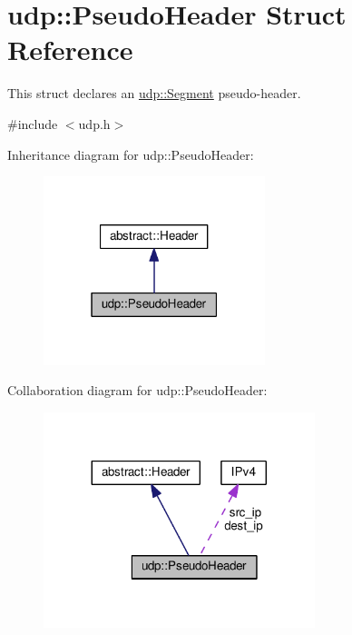 \hypertarget{structudp_1_1PseudoHeader}{}\section{udp\+:\+:Pseudo\+Header Struct Reference}
\label{structudp_1_1PseudoHeader}


This struct declares an \hyperlink{structudp_1_1Segment}{udp\+::\+Segment} pseudo-\/header.  




{\ttfamily \#include $<$udp.\+h$>$}



Inheritance diagram for udp\+:\+:Pseudo\+Header\+:\nopagebreak
\begin{figure}[H]
\begin{center}
\leavevmode
\includegraphics[width=183pt]{structudp_1_1PseudoHeader__inherit__graph}
\end{center}
\end{figure}


Collaboration diagram for udp\+:\+:Pseudo\+Header\+:\nopagebreak
\begin{figure}[H]
\begin{center}
\leavevmode
\includegraphics[width=224pt]{structudp_1_1PseudoHeader__coll__graph}
\end{center}
\end{figure}

